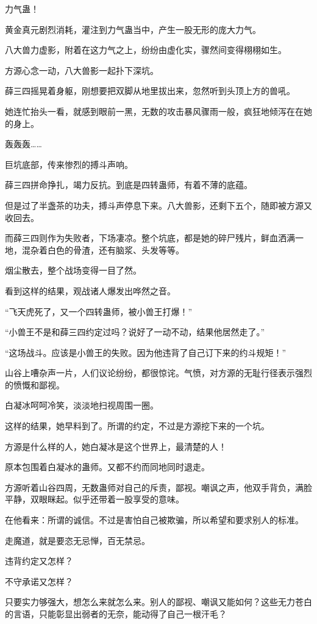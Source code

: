 \begin{this_body}
力气蛊！

黄金真元剧烈消耗，灌注到力气蛊当中，产生一股无形的庞大力气。

八大兽力虚影，附着在这力气之上，纷纷由虚化实，骤然间变得栩栩如生。

方源心念一动，八大兽影一起扑下深坑。

薛三四摇晃着身躯，刚想要把双脚从地里拔出来，忽然听到头顶上方的兽吼。

她连忙抬头一看，就感到眼前一黑，无数的攻击暴风骤雨一般，疯狂地倾泻在在她的身上。

轰轰轰……

巨坑底部，传来惨烈的搏斗声响。

薛三四拼命挣扎，竭力反抗。到底是四转蛊师，有着不薄的底蕴。

但是过了半盏茶的功夫，搏斗声停息下来。八大兽影，还剩下五个，随即被方源又收回去。

而薛三四则作为失败者，下场凄凉。整个坑底，都是她的碎尸残片，鲜血洒满一地，混杂着白色的骨渣，还有脑浆、头发等等。

烟尘散去，整个战场变得一目了然。

看到这样的结果，观战诸人爆发出哗然之音。

“飞天虎死了，又一个四转蛊师，被小兽王打爆！”

“小兽王不是和薛三四约定过吗？说好了一动不动，结果他居然走了。”

“这场战斗。应该是小兽王的失败。因为他违背了自己订下来的约斗规矩！”

山谷上嘈杂声一片，人们议论纷纷，都很惊诧。气愤，对方源的无耻行径表示强烈的愤慨和鄙视。

白凝冰呵呵冷笑，淡淡地扫视周围一圈。

这样的结果，她早料到了。所谓的约定，不过是方源挖下来的一个坑。

方源是什么样的人，她白凝冰是这个世界上，最清楚的人！

原本包围着白凝冰的蛊师。又都不约而同地同时退走。

方源听着山谷四周，无数蛊师对自己的斥责，鄙视。嘲讽之声，他双手背负，满脸平静，双眼眯起。似乎还带着一股享受的意味。

在他看来：所谓的诚信。不过是害怕自己被欺骗，所以希望和要求别人的标准。

走魔道，就是要恣无忌惮，百无禁忌。

违背约定又怎样？

不守承诺又怎样？

只要实力够强大，想怎么来就怎么来。别人的鄙视、嘲讽又能如何？这些无力苍白的言语，只能彰显出弱者的无奈，能动得了自己一根汗毛？


\end{this_body}
